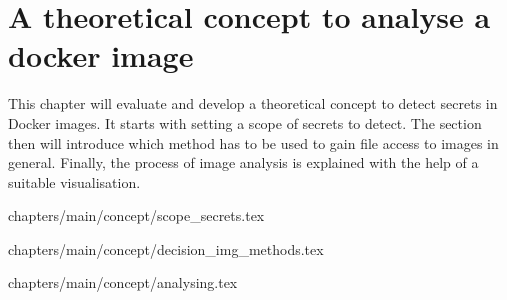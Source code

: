 \chapter{A theoretical concept to analyse a docker image}
\label{ch:theory}
This chapter will evaluate and develop a theoretical concept to detect secrets in Docker images. It starts with setting a scope of secrets to detect. The section then will introduce which method has to be used to gain file access to images in general. Finally, the process of image analysis is explained with the help of a suitable visualisation.

 {chapters/main/concept/scope_secrets.tex}

 {chapters/main/concept/decision_img_methods.tex}

 {chapters/main/concept/analysing.tex}
